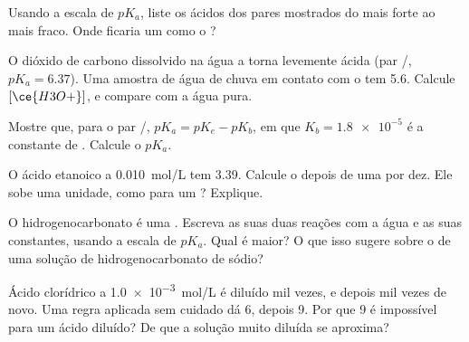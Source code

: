 \begin{exercise}[$\star\star$]\label{exo:g12:ka-and-pka:9}
Usando a escala de $pK_a$, liste os ácidos dos pares mostrados do mais
forte ao mais fraco. Onde ficaria um  como o ?
\end{exercise}

\begin{exercise}[$\star\star$]\label{exo:g12:ka-and-pka:10}
O dióxido de carbono dissolvido na água a torna levemente ácida (par
/, $pK_a = 6.37$). Uma amostra de água de chuva em contato com o
 tem  5.6. Calcule $[\ce{H3O+}]$, e compare com a água pura.
\end{exercise}

\begin{exercise}[$\star\star$]\label{exo:g12:ka-and-pka:11}
Mostre que, para o par /, $pK_a = pK_e - pK_b$, em que
$K_b = \num{1.8e-5}$ é a constante de .
Calcule o $pK_a$.
\end{exercise}

\begin{exercise}[$\star\star\star$]\label{exo:g12:ka-and-pka:12}
O ácido etanoico a \qty{0.010}{mol/L} tem  3.39. Calcule o  depois
de uma  por dez. Ele sobe uma unidade, como para um ? Explique.
\end{exercise}

\begin{exercise}[$\star\star\star$]\label{exo:g12:ka-and-pka:13}
O  hidrogenocarbonato é uma . Escreva as suas duas
reações com a água e as suas constantes, usando a escala de $pK_a$.
Qual é maior? O que isso sugere sobre o  de uma solução de
hidrogenocarbonato de sódio?
\end{exercise}

\begin{exercise}[$\star\star\star$]\label{exo:g12:ka-and-pka:14}
Ácido clorídrico a \qty{1.0e-3}{mol/L} é diluído mil vezes, e depois mil
vezes de novo. Uma regra aplicada sem cuidado dá  6, depois  9. Por
que  9 é impossível para um ácido diluído? De que  a solução muito
diluída se aproxima?
\end{exercise}

